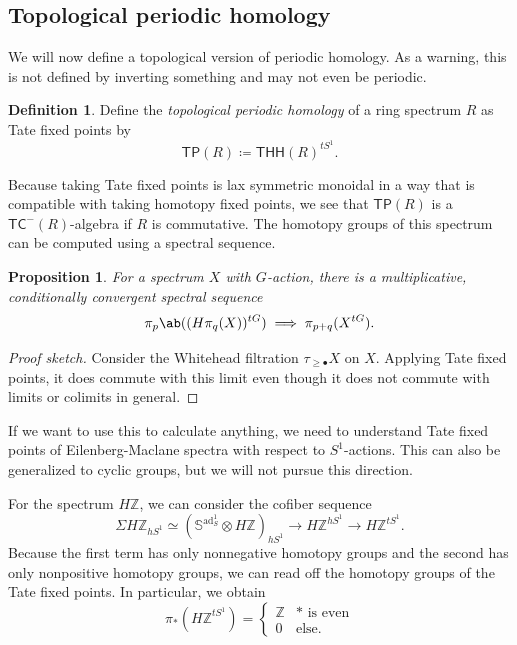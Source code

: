 \documentclass[10pt, oneside]{memoir}
\newtheorem{prop}[thm]{Proposition}
\theoremstyle{definition}
\newtheorem{defn}[thm]{Definition}
\theoremstyle{remark}
\theoremstyle{plain}
\theoremstyle{definition}
\theoremstyle{remark}
\newcommand{\Z}{\mathbb{Z}}
\newcommand{\bS}{\mathbb{S}}
\newcommand{\ms}[1]{\mathsf{#1}}
\newcommand{\1}{\mathbf{1}}
\newcommand{\2}{\mathbf{2}}
\newcommand{\3}{\mathbf{3}}
\newcommand{\THH}{\ms{THH}}
\newcommand{\TC}{\ms{TC}}
\newcommand{\TP}{\ms{TP}}
\DeclareMathOperator{\ad}{ad}
\begin{document}
\subsection{Topological periodic homology}%
\label{sub:Topological periodic homology}

We will now define a topological version of periodic homology. As a warning, this is not defined by inverting something and may not even be periodic.

\begin{defn}
    Define the \textit{topological periodic homology} of a ring spectrum \(R \) as Tate fixed points by
    \[ \TP(R) \coloneqq \THH(R)^{tS^1}. \]
\end{defn}

Because taking Tate fixed points is lax symmetric monoidal in a way that is compatible with taking homotopy fixed points, we see that \(\TP(R) \) is a \(\TC^-(R) \)-algebra if \(R \) is commutative. The homotopy groups of this spectrum can be computed using a spectral sequence.

\begin{prop}
    For a spectrum \(X \) with \(G \)-action, there is a multiplicative, conditionally convergent spectral sequence 
    \[ \pi_p\ab((H\pi_q(X))^{tG}) \implies \pi_{p+q}(X^{tG}). \]
\end{prop}

\begin{proof}[Proof sketch]
    Consider the Whitehead filtration \(\tau_{\geq \bullet} X \) on \(X \). Applying Tate fixed points, it does commute with this limit even though it does not commute with limits or colimits in general.
\end{proof}

If we want to use this to calculate anything, we need to understand Tate fixed points of Eilenberg-Maclane spectra with respect to \(S^1 \)-actions. This can also be generalized to cyclic groups, but we will not pursue this direction.

For the spectrum \(H\Z \), we can consider the cofiber sequence
\[ \Sigma H\Z_{h S^1} \simeq (\bS^{\ad_S^1} \otimes H\Z)_{hS^1} \to H\Z^{hS^1} \to H\Z^{tS^1}. \]
Because the first term has only nonnegative homotopy groups and the second has only nonpositive homotopy groups, we can read off the homotopy groups of the Tate fixed points. In particular, we obtain
\[ \pi_* (H\Z^{tS^1}) = \begin{cases}
    \Z & * \text{ is even} \\
    0 & \text{else}.
\end{cases} \]
\end{document}
